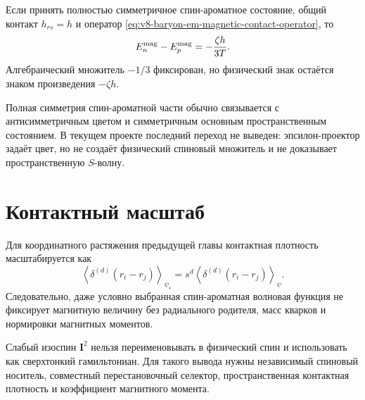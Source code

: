 \begin{proposition}
Если принять полностью симметричное спин-ароматное состояние, общий
контакт $h_{rs}=h$ и оператор \eqref{eq:v8-baryon-em-magnetic-contact-operator},
то
\begin{equation}
 E_n^{\rm mag}-E_p^{\rm mag}=-\frac{\zeta h}{3T}.
 \label{eq:v8-baryon-em-conditional-magnetic-splitting}
\end{equation}
Алгебраический множитель $-1/3$ фиксирован, но физический знак остаётся
знаком произведения $-\zeta h$.
\end{proposition}

Полная симметрия спин-ароматной части обычно связывается с
антисимметричным цветом и симметричным основным пространственным состоянием.
В текущем проекте последний переход не выведен: эпсилон-проектор задаёт
цвет, но не создаёт физический спиновый множитель и не доказывает
пространственную $S$-волну.

\section{Контактный масштаб}

Для координатного растяжения предыдущей главы контактная плотность
масштабируется как
\begin{equation}
 \left\langle\delta^{(d)}(r_i-r_j)\right\rangle_{\psi_s}
 =s^d\left\langle\delta^{(d)}(r_i-r_j)\right\rangle_{\psi}.
 \label{eq:v8-baryon-em-contact-density-dilation}
\end{equation}
Следовательно, даже условно выбранная спин-ароматная волновая функция не
фиксирует магнитную величину без радиального родителя, масс кварков и
нормировки магнитных моментов.

\begin{nogocriterion}
Слабый изоспин $\mathbf I^2$ нельзя переименовывать в физический спин и
использовать как сверхтонкий гамильтониан. Для такого вывода нужны
независимый спиновый носитель, совместный перестановочный селектор,
пространственная контактная плотность и коэффициент магнитного момента.
\end{nogocriterion}

